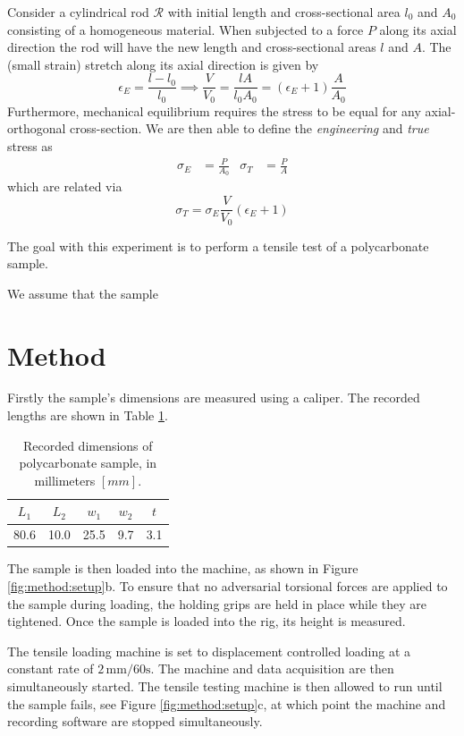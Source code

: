 \documentclass[9pt,a4paper,twocolumn,twoside]{rho-class/rho}
\begin{document}
	
	Consider a cylindrical rod $\mathcal{R}$ with initial length and cross-sectional area $l_0$ and $A_0$ consisting of a homogeneous material. When subjected to a force $P$ along its axial direction the rod will have the new length and cross-sectional areas $l$ and $A$. The (small strain) stretch along its axial direction is given by 
	$$
		\epsilon_E = \frac{l-l_0}{l_0} \implies \frac{V}{V_0} = \frac{lA}{l_0A_0} = \left(\epsilon_E + 1\right)\frac{A}{A_0}
	$$
	Furthermore, mechanical equilibrium requires the stress to be equal for any axial-orthogonal cross-section. We are then able to define the \textit{engineering} and \textit{true} stress as
	\begin{align*}
		  \sigma_E 	& = \frac{P}{A_0} %
		& \sigma_T	& = \frac{P}{A}
	\end{align*}
	which are related via 
	\begin{equation*}
		\sigma_T = \sigma_E\frac{V}{V_0}\left(\epsilon_E + 1\right)
	\end{equation*}
	
	The goal with this experiment is to perform a tensile test of a polycarbonate sample.
	
	We assume that the sample
	
	\section{Method}
	Firstly the sample's dimensions are measured using a caliper. The recorded lengths are shown in Table \ref{tab:method:polycarbonate dimensions.}.
	
	\begin{table}
		\caption{Recorded dimensions of polycarbonate sample, in millimeters $[mm]$.}
		\centering
		\begin{tabular}{c|c|c|c|c}
			$L_1$ 	& $L_2$	& $w_1$	& $w_2$ & $t$ 	\\
			\hline
			80.6	& 10.0	& 25.5	& 9.7 	& 3.1 	\\
		\end{tabular}
		\label{tab:method:polycarbonate dimensions.}
	\end{table}
	
	The sample is then loaded into the machine, as shown in Figure \ref{fig:method:setup}b. To ensure that no adversarial torsional forces are applied to the sample during loading, the holding grips are held in place while they are tightened. Once the sample is loaded into the rig, its height is measured.
	
	The tensile loading machine is set to displacement controlled loading at a constant rate of $2\,\text{mm}/60\text{s}$. The machine and data acquisition are then simultaneously started. The tensile testing machine is then allowed to run until the sample fails, see Figure \ref{fig:method:setup}c, at which point the machine and recording software are stopped simultaneously.
\end{document}
